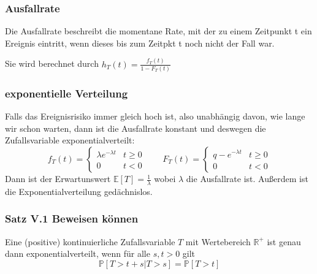 \documentclass[]{article}
\begin{document}
\subsubsection*{Ausfallrate}
Die Ausfallrate beschreibt die momentane Rate, mit der zu einem Zeitpunkt t ein Ereignis eintritt, wenn dieses bis zum Zeitpkt t noch nicht der Fall war.

Sie wird berechnet durch $h_T(t)= \frac{f_T(t)}{1-F_T(t)}$ 

\subsubsection*{exponentielle Verteilung}
Falls das Ereignisrisiko immer gleich hoch ist, also unabhängig davon, wie lange wir schon warten, dann ist die Ausfallrate konstant und deswegen die Zufallsvariable exponentialverteilt: 
\begin{equation*}
f_T(t) =
\begin{cases}
\lambda e^{-\lambda t} & t \geq 0 \\
0 & t < 0
\end{cases}
\qquad
F_T(t) = 
\begin{cases}
q - e^{- \lambda t} & t \geq 0 \\
0 & t < 0
\end{cases}
\end{equation*}
Dann ist der Erwartunswert $\mathbb{E}[T]=\frac{1}{\lambda}$ wobei $\lambda $ die Ausfallrate ist. 
Außerdem ist die Exponentialverteilung gedächnislos. 

\subsubsection*{Satz V.1 Beweisen können}
Eine (positive) kontinuierliche Zufallsvariable $T$ mit Wertebereich $\mathbb{R}^+$ ist genau dann exponentialverteilt, wenn für alle $s,t > 0$ gilt
\begin{equation}
\mathbb{P}[T > t+s | T > s] = \mathbb{P}[T > t] \label{VL24_1}
\end{equation}
\end{document}
